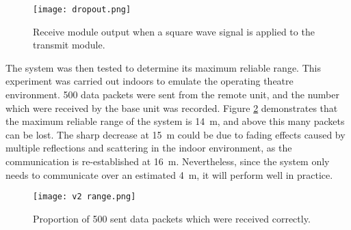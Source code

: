 \begin{figure}[ht]
	\centering
	\texttt{[image: dropout.png]}
	\caption{Receive module output when a square wave signal is applied to the transmit module.}
	\label{fig: dropout}
\end{figure}

The system was then tested to determine its maximum reliable range. This experiment was carried out indoors to emulate the operating theatre environment. 500 data packets were sent from the remote unit, and the number which were received by the base unit was recorded. Figure \ref{fig: range} demonstrates that the maximum reliable range of the system is \SI{14}{\metre}, and above this many packets can be lost. The sharp decrease at \SI{15}{\metre} could be due to fading effects caused by multiple reflections and scattering in the indoor environment, as the communication is re-established at \SI{16}{\metre}. Nevertheless, since the system only needs to communicate over an estimated \SI{4}{\metre}, it will perform well in practice.

\begin{figure}[ht]
	\centering
	\texttt{[image: v2 range.png]}
	\caption{Proportion of 500 sent data packets which were received correctly.}
	\label{fig: range}
	\vspace{-8mm}
\end{figure}








